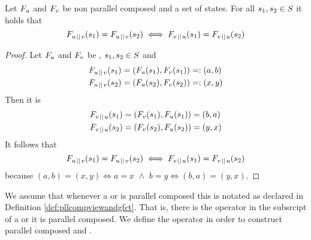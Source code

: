 \documentclass[preview]{standalone}
\begin{document}
\begin{proposition}
	Let $\grpfct[u]$ and $\grpfct[v]$ be non parallel composed \grpfctsN and \states a set of states. For all $\state_1, \state_2 \in \states$ it holds that
	\[
	\grpfct[u \pll v](\state_1) = \grpfct[u \pll v](\state_2) \iff \grpfct[v \pll u](\state_1) = \grpfct[v \pll u](\state_2)
	\]
\end{proposition}

\begin{proof}
	Let $\grpfct[u]$ and $\grpfct[v]$ be \grpfctsN, $\state_1, \state_2 \in \states$ and
	\begin{align*}
		\grpfct[u \pll v](\state_1) &= (\grpfct[u](\state_1), \grpfct[v](\state_1)) =: (a, b) \\
		\grpfct[u \pll v](\state_2) &= (\grpfct[u](\state_2), \grpfct[v](\state_2)) =: (x, y)			
	\end{align*}
	Then it is
	\begin{align*}
		\grpfct[v \pll u](\state_1) &= (\grpfct[v](\state_1), \grpfct[u](\state_1)) = (b, a) \\
		\grpfct[v \pll u](\state_2) &= (\grpfct[v](\state_2), \grpfct[u](\state_2)) = (y, x)
	\end{align*}
	It follows that
	\[
	\grpfct[u \pll v](\state_1) = \grpfct[u \pll v](\state_2) \iff \grpfct[v \pll u](\state_1) = \grpfct[v \pll u](\state_2)
	\]
	because $(a, b) = (x, y) \iff a = x \,\, \land \,\, b = y \iff (b, a) = (y, x)$.
\end{proof}

We assume that whenever a \viewN or \grpfctN is parallel composed this is notated as declared in Definition \ref{def:pllcompviewandgfct}. That is, \iffN there is the operator \pll in the subsrcipt of a \viewN or \grpfctN it is parallel composed. We define the operator \pll in order to construct parallel composed \grpfctsN and \viewsN. 
\end{document}
